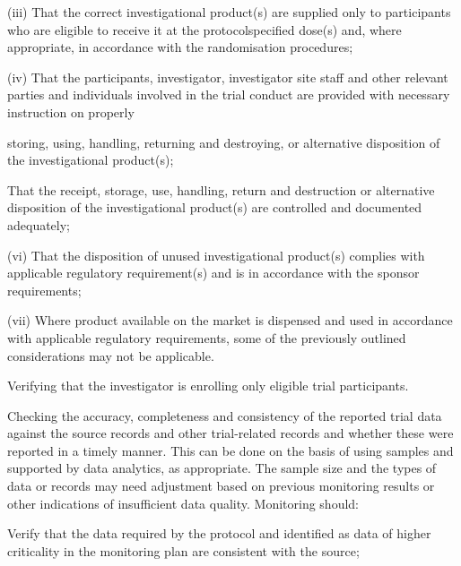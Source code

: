 \documentclass[11pt]{article}
\begin{document}
(iii) That the correct investigational product(s) are supplied only to participants who are eligible to receive it at the protocolspecified dose(s) and, where appropriate, in accordance with the randomisation procedures;


(iv) That the participants, investigator, investigator site staff and other relevant parties and individuals involved in the trial conduct are provided with necessary instruction on properly


storing, using, handling, returning and destroying, or alternative disposition of the investigational product(s);


\begin{description}[leftmargin=2.5cm,style=sameline]

\item[(v)] That the receipt, storage, use, handling, return and destruction or alternative disposition of the investigational product(s) are controlled and documented adequately;

\end{description}

(vi) That the disposition of unused investigational product(s) complies with applicable regulatory requirement(s) and is in accordance with the sponsor requirements;


(vii) Where product available on the market is dispensed and used in accordance with applicable regulatory requirements, some of the previously outlined considerations may not be applicable.


\begin{description}[leftmargin=2.5cm,style=sameline]

\item[(a)] Verifying that the investigator is enrolling only eligible trial participants.

\item[(b)] Checking the accuracy, completeness and consistency of the reported trial data against the source records and other trial-related records and whether these were reported in a timely manner. This can be done on the basis of using samples and supported by data analytics, as appropriate. The sample size and the types of data or records may need adjustment based on previous monitoring results or other indications of insufficient data quality. Monitoring should:

\item[(i)] Verify that the data required by the protocol and identified as data of higher criticality in the monitoring plan are consistent with the source;

\end{description}
\end{document}
